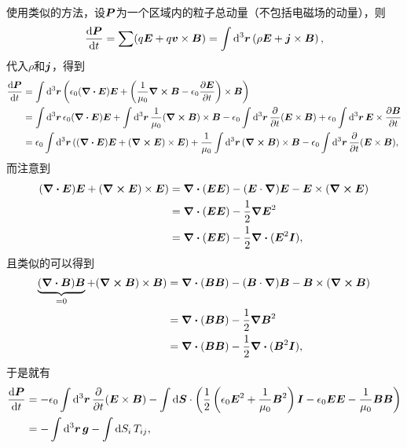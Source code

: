 \documentclass[UTF8, a4paper]{ctexart}
\begin{document}
使用类似的方法，设$\vb*{P}$为一个区域内的粒子总动量（不包括电磁场的动量），则
\[
    \dv{\vb*{P}}{t} = \sum (q \vb*{E} + q \vb*{v} \times \vb*{B}) = \int \dd[3]{\vb*{r}} \left( \rho \vb*{E} + \vb*{j} \times \vb*{B} \right),
\]
代入$\rho$和$\vb*{j}$，得到
\[
    \begin{aligned}
        \dv{\vb*{P}}{t} &= \int \dd[3]{\vb*{r}} \left(\epsilon_0 (\div{\vb*{E}}) \vb*{E} + \left( \frac{1}{\mu_0} \curl{\vb*{B}} - \epsilon_0 \pdv{\vb*{E}}{t} \right) \times \vb*{B} \right) \\
        &= \int \dd[3]{\vb*{r}} \epsilon_0 (\div{\vb*{E}}) \vb*{E} + \int \dd[3]{\vb*{r}} \frac{1}{\mu_0} (\curl{\vb*{B}}) \times \vb*{B} - \epsilon_0 \int \dd[3]{\vb*{r}} \pdv{t} (\vb*{E} \times \vb*{B}) + \epsilon_0 \int \dd[3]{\vb*{r}} \vb*{E} \times \pdv{\vb*{B}}{t} \\
        &= \epsilon_0 \int \dd[3]{\vb*{r}} ((\div{\vb*{E}}) \vb*{E} + (\curl{\vb*{E}}) \times \vb*{E}) + \frac{1}{\mu_0} \int \dd[3]{\vb*{r}} (\curl{\vb*{B}}) \times \vb*{B} - \epsilon_0 \int \dd[3]{\vb*{r}} \pdv{t} (\vb*{E} \times \vb*{B}),
    \end{aligned}
\]
而注意到
\[
    \begin{aligned}
        (\div{\vb*{E}}) \vb*{E} + (\curl{\vb*{E}}) \times \vb*{E}) &= \div{(\vb*{E} \vb*{E})} - (\vb*{E} \cdot \grad) \vb*{E} - \vb*{E} \times (\curl{\vb*{E}}) \\
        &= \div{(\vb*{E} \vb*{E})} - \frac{1}{2} \grad{\vb*{E}^2} \\
        &= \div{(\vb*{E} \vb*{E})} - \frac{1}{2} \div{(\vb*{E}^2 \vb*{I})},
    \end{aligned}
\]
且类似的可以得到
\[
    \begin{aligned}
        \underbrace{(\div{\vb*{B}}) \vb*{B}}_{=0} + (\curl{\vb*{B}}) \times \vb*{B}) &= \div{(\vb*{B} \vb*{B})} - (\vb*{B} \cdot \grad) \vb*{B} - \vb*{B} \times (\curl{\vb*{B}}) \\
        &= \div{(\vb*{B} \vb*{B})} - \frac{1}{2} \grad{\vb*{B}^2} \\
        &= \div{(\vb*{B} \vb*{B})} - \frac{1}{2} \div{(\vb*{B}^2 \vb*{I})},
    \end{aligned}
\]
于是就有
\[
    \begin{aligned}
        \dv{\vb*{P}}{t} &= - \epsilon_0 \int \dd[3]{\vb*{r}} \pdv{t} (\vb*{E} \times \vb*{B}) - \int \dd{\vb*{S}} \cdot \left( \frac{1}{2} \left( \epsilon_0 \vb*{E}^2 + \frac{1}{\mu_0} \vb*{B}^2 \right) \vb*{I} - \epsilon_0 \vb*{E} \vb*{E} - \frac{1}{\mu_0} \vb*{B} \vb*{B} \right) \\
        &= - \int \dd[3]{\vb*{r}} \vb*{g} - \int \dd{S_i} T_{ij},
    \end{aligned}
\]
\end{document}
